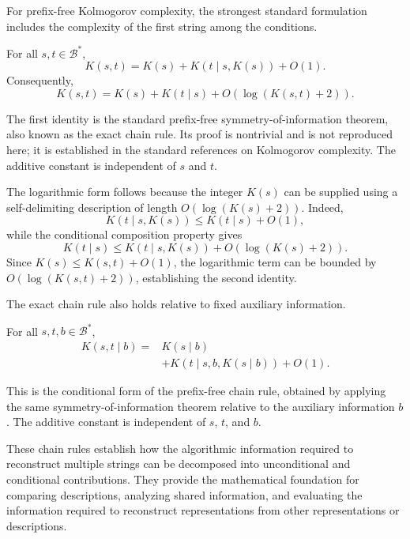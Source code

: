 For prefix-free Kolmogorov complexity, the strongest standard formulation includes the complexity of the first string among the conditions.

\begin{proposition}
\label{prop:kolmogorov_chain_rule}
For all $s,t\in\mathcal{B}^*$,
\[
K(s,t)=K(s)+K(t\mid s,K(s))+O(1).
\]
Consequently,
\[
K(s,t)=K(s)+K(t\mid s) +O(\log(K(s,t)+2)).
\]
\end{proposition}

The first identity is the standard prefix-free symmetry-of-information theorem, also known as the exact chain rule. Its proof is nontrivial and is not reproduced here; it is established in the standard references on Kolmogorov complexity. The additive constant is independent of $s$ and $t$.

The logarithmic form follows because the integer $K(s)$ can be supplied using a self-delimiting description of length $O(\log(K(s)+2))$. Indeed,
\[
K(t\mid s,K(s))
\leq K(t\mid s)+O(1),
\]
while the conditional composition property gives
\[
K(t\mid s)
\leq K(t\mid s,K(s))
+O(\log(K(s)+2)).
\]
Since $K(s)\leq K(s,t)+O(1)$, the logarithmic term can be bounded by $O(\log(K(s,t)+2))$, establishing the second identity.

The exact chain rule also holds relative to fixed auxiliary information.

\begin{proposition}
\label{prop:conditional-chain-rule}
For all $s,t,b\in\mathcal{B}^*$,
\[
\begin{aligned}
K(s,t\mid b)
={}&K(s\mid b)\\
&+K(t\mid s,b,K(s\mid b))+O(1).
\end{aligned}
\]
\end{proposition}

This is the conditional form of the prefix-free chain rule, obtained by applying the same symmetry-of-information theorem relative to the auxiliary information $b$. The additive constant is independent of $s$, $t$, and $b$.

These chain rules establish how the algorithmic information required to reconstruct multiple strings can be decomposed into unconditional and conditional contributions. They provide the mathematical foundation for comparing descriptions, analyzing shared information, and evaluating the information required to reconstruct representations from other representations or descriptions.



